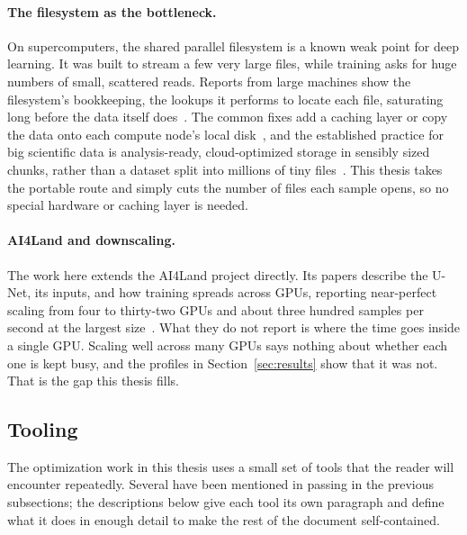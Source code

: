 \documentclass[12pt,a4paper]{article}
\begin{document}
\paragraph{The filesystem as the bottleneck.} On supercomputers, the shared parallel filesystem
is a known weak point for deep learning. It was built to stream a few very large files, while
training asks for huge numbers of small, scattered reads. Reports from large machines show the
filesystem's bookkeeping, the lookups it performs to locate each file, saturating long before the
data itself does~\cite{nextplatform_hpcfs,vef2016gpfs}. The common fixes add a caching layer or
copy the data onto each compute node's local disk~\cite{hvac2022}, and the established practice
for big scientific data is analysis-ready, cloud-optimized storage in sensibly sized chunks,
rather than a dataset split into millions of tiny files~\cite{abernathey2021,dask_chunks}. This thesis takes the portable route and simply cuts the number of
files each sample opens, so no special hardware or caching layer is needed.

\paragraph{AI4Land and downscaling.} The work here extends the AI4Land project directly. Its
papers describe the U-Net, its inputs, and how training spreads across GPUs, reporting
near-perfect scaling from four to thirty-two GPUs and about three hundred samples per second at
the largest size~\cite{mozaffari2025neurips,mozaffari2026ai4land}. What they do not report is
where the time goes inside a single GPU. Scaling well across many GPUs says nothing about whether
each one is kept busy, and the profiles in Section~\ref{sec:results} show that it was not. That
is the gap this thesis fills.

\subsection{Tooling}

The optimization work in this thesis uses a small set of tools that the reader will encounter
repeatedly. Several have been mentioned in passing in the previous subsections; the
descriptions below give each tool its own paragraph and define what it does in enough detail
to make the rest of the document self-contained.
\end{document}
